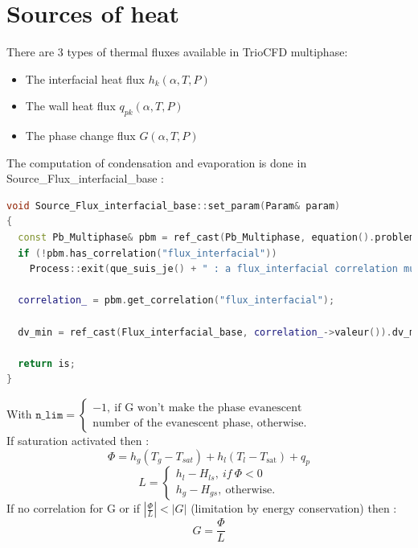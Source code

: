 \section{Sources of heat}
There are 3 types of thermal fluxes available in TrioCFD multiphase:
\begin{itemize}
    \item[\small \textcolor{blue}{\ding{109}}] The interfacial heat flux $h_k(\alpha,T,P)$
    \item[\small \textcolor{blue}{\ding{109}}] The wall heat flux $q_{pk}(\alpha,T,P)$
    \item[\small \textcolor{blue}{\ding{109}}]  The phase change flux $G(\alpha,T,P)$
\end{itemize}
The computation of condensation and evaporation is done in Source_Flux_interfacial_base :
\begin{lstlisting}[language=c++]
void Source_Flux_interfacial_base::set_param(Param& param)
{
  const Pb_Multiphase& pbm = ref_cast(Pb_Multiphase, equation().probleme());
  if (!pbm.has_correlation("flux_interfacial"))
    Process::exit(que_suis_je() + " : a flux_interfacial correlation must be defined in the global correlations { } block!");

  correlation_ = pbm.get_correlation("flux_interfacial");

  dv_min = ref_cast(Flux_interfacial_base, correlation_->valeur()).dv_min();

  return is;
}
\end{lstlisting}
With $\texttt{n\_lim}=\begin{cases} -1,\ \text{if G won't make the phase evanescent}\\ \text{number of the evanescent phase, otherwise.}
\end{cases}$\\
If saturation activated then :
\begin{equation}
    \Phi=h_g(T_g-T_{sat})+h_l(T_l-T_{\text{sat}})+q_p
\end{equation}
\begin{equation}
    L=\begin{cases} h_l-H_{ls},\ if\ \Phi<0\\ h_g-H_{gs},\ \text{otherwise}.  \end{cases}
\end{equation}
If no correlation for G or if $|\frac{\Phi}{L}|<|G|$ (limitation by energy conservation) then :
\begin{equation}
   G=\frac{\Phi}{L}
\end{equation}
